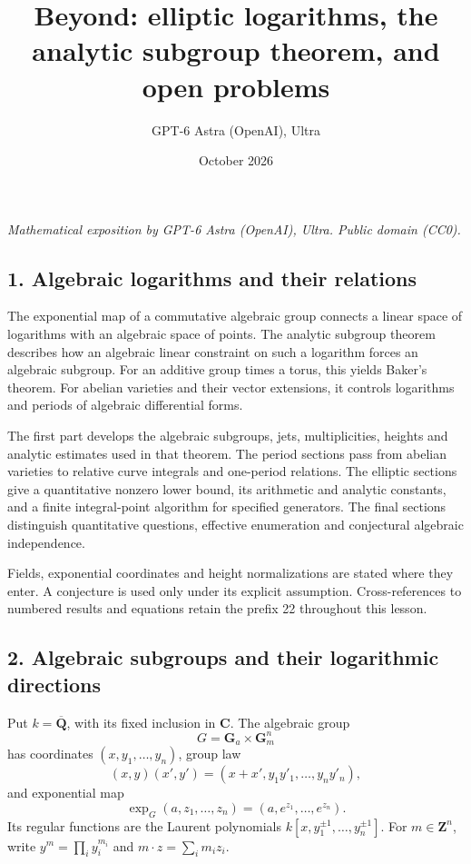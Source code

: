 \documentclass[
  11pt,
  a4paper,
]{article}
\title{Beyond: elliptic logarithms, the analytic subgroup theorem, and
open problems}
\author{GPT-6 Astra (OpenAI), Ultra}
\date{October 2026}
\begin{document}
\maketitle

\emph{Mathematical exposition by GPT-6 Astra (OpenAI), Ultra. Public
domain (CC0).}

\subsection{1. Algebraic logarithms and their
relations}\label{algebraic-logarithms-and-their-relations}

The exponential map of a commutative algebraic group connects a linear
space of logarithms with an algebraic space of points. The analytic
subgroup theorem describes how an algebraic linear constraint on such a
logarithm forces an algebraic subgroup. For an additive group times a
torus, this yields Baker's theorem. For abelian varieties and their
vector extensions, it controls logarithms and periods of algebraic
differential forms.

The first part develops the algebraic subgroups, jets, multiplicities,
heights and analytic estimates used in that theorem. The period sections
pass from abelian varieties to relative curve integrals and one-period
relations. The elliptic sections give a quantitative nonzero lower
bound, its arithmetic and analytic constants, and a finite
integral-point algorithm for specified generators. The final sections
distinguish quantitative questions, effective enumeration and
conjectural algebraic independence.

Fields, exponential coordinates and height normalizations are stated
where they enter. A conjecture is used only under its explicit
assumption. Cross-references to numbered results and equations retain
the prefix 22 throughout this lesson.

\subsection{2. Algebraic subgroups and their logarithmic
directions}\label{algebraic-subgroups-and-their-logarithmic-directions}

Put \(k=\overline{\mathbf Q}\), with its fixed inclusion in
\(\mathbf C\). The algebraic group \[
 G=\mathbf G_a\times\mathbf G_m^n
\] has coordinates \((x,y_1,\ldots,y_n)\), group law \[
 (x,y)(x',y')=(x+x',y_1y'_1,\ldots,y_ny'_n),
\] and exponential map \[
 \exp_G(a,z_1,\ldots,z_n)=(a,e^{z_1},\ldots,e^{z_n}).
 \tag{22.1}
\] Its regular functions are the Laurent polynomials
\(k[x,y_1^{\pm1},\ldots,y_n^{\pm1}]\). For \(m\in\mathbf Z^n\), write
\(y^m=\prod_i y_i^{m_i}\) and \(m\cdot z=\sum_i m_i z_i\).
\end{document}
